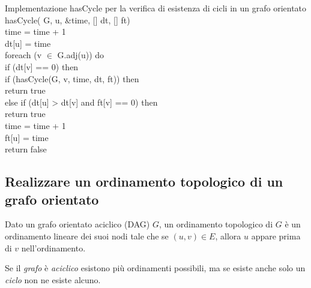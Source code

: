 \begin{minicode}{Implementazione hasCycle per la verifica di esistenza di cicli
    in un grafo orientato}
\ind{} hasCycle( G,  u,  \&time, [] dt, [] ft)\\
    time = time + 1\\
    dt[u] = time\\
    \indf foreach (v $\in$ G.adj(u)) do\\
        \indff if (dt[v] == 0) then\\
            \indfff if (hasCycle(G, v, time, dt, ft)) then\\
                return true\\
        \indff else if (dt[u] > dt[v] and ft[v] == 0) then\\
            return true\\
    \indf time = time + 1\\
    \indf ft[u] = time\\
    \indf return false
\end{minicode}

\subsection{Realizzare un ordinamento topologico di un grafo orientato}
\begin{definition}
    Dato un grafo orientato aciclico (DAG) $G$, un ordinamento topologico di $G$
    è un ordinamento lineare dei suoi nodi tale che se $(u,v)\in E$, allora $u$
    appare prima di $v$ nell'ordinamento.
\end{definition}

\newpage
\begin{note}
    Se il \emph{grafo} è \emph{aciclico} esistono più ordinamenti possibili, ma
    se esiste anche solo un \emph{ciclo} non ne esiste alcuno.
\end{note}

